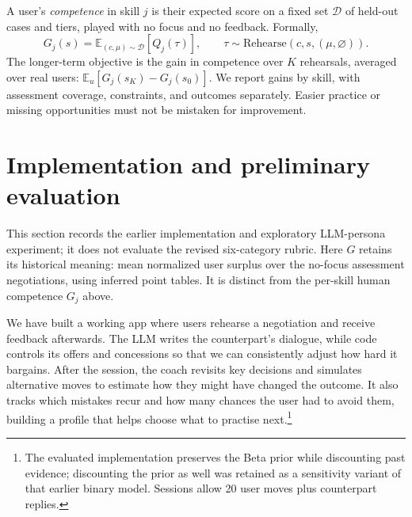\documentclass[11pt]{article}
\makeatletter
\renewcommand\paragraph{\@startsection{paragraph}{4}{\z@}{0.7ex \@plus 0.3ex}{-1em}{\normalfont\normalsize\bfseries}}
\newcommand{\E}{\mathbb{E}}
\makeatother
\begin{document}
A user's \emph{competence} in skill $j$ is their expected score on a fixed set $\mathcal{D}$
of held-out cases and tiers, played with no focus and no feedback. Formally,
\begin{equation}
G_j(s)=\E_{(c,\mu)\sim\mathcal{D}}[Q_j(\tau)],\qquad
\tau\sim\mathrm{Rehearse}(c,s,(\mu,\varnothing)).
\end{equation}
The longer-term objective is the gain in competence over $K$ rehearsals, averaged over
real users: $\E_u[G_j(s_K)-G_j(s_0)]$. We report gains by skill, with assessment coverage,
constraints, and outcomes separately. Easier practice or missing opportunities must not
be mistaken for improvement.


\section{Implementation and preliminary evaluation}

This section records the earlier implementation and exploratory LLM-persona experiment;
it does not evaluate the revised six-category rubric. Here $G$ retains its historical
meaning: mean normalized user surplus over the no-focus assessment negotiations, using
inferred point tables. It is distinct from the per-skill human competence $G_j$ above.

\paragraph{Completed system.}
We have built a working app where users rehearse a negotiation and receive feedback
afterwards. The LLM writes the counterpart's dialogue, while code controls its offers
and concessions so that we can consistently adjust how hard it bargains. After the
session, the coach revisits key decisions and simulates alternative moves to estimate
how they might have changed the outcome. It also tracks which mistakes recur and how
many chances the user had to avoid them, building a profile that helps choose what to
practise next.\footnote{The evaluated implementation preserves the Beta prior while
discounting past evidence; discounting the prior as well was retained as a sensitivity
variant of that earlier binary model.
Sessions allow 20 user moves plus counterpart replies.}
\end{document}
